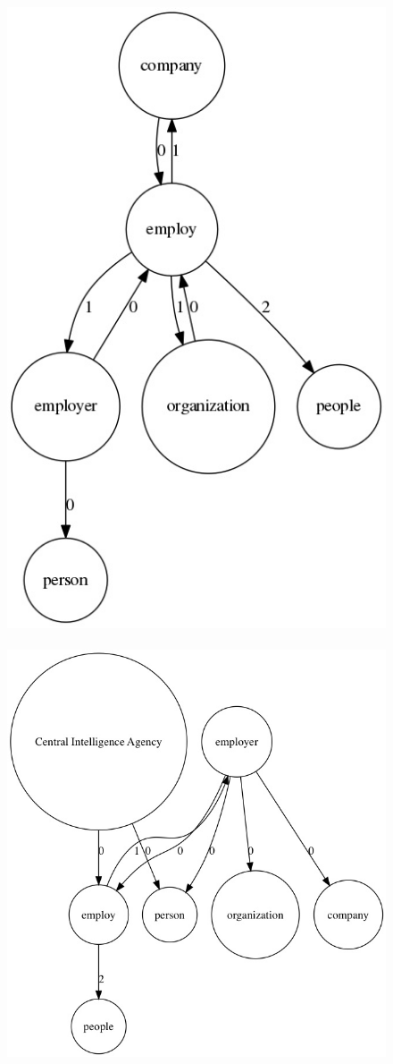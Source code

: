 \documentclass[twoside,b5paper,10pt]{article}
\begin{document}
 \begin{figure}[htb]
  \vspace{3pt}
  \centerline{
  \hbox{
  \hspace{0.0in}
        \includegraphics[scale=0.4]{Figure/employer.jpg}
        \hspace{0.1\columnwidth}
        \includegraphics[scale=0.4]{Figure/employernew.jpg}
}}
\end{figure}
\end{document}

